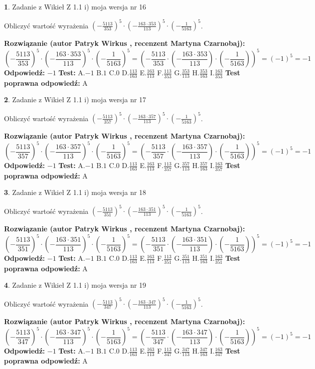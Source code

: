 \documentclass[12pt, a4paper]{article}
\theoremstyle{definition} %
\newtheorem{zad}{}
\newcommand{\zadStart}[1]{\begin{zad}#1\newline}
\newcommand{\zadStop}{\end{zad}}
\newcommand{\rozwStart}[2]{\noindent \textbf{Rozwiązanie (autor #1 , recenzent #2): }\newline}
\newcommand{\rozwStop}{\newline}
\newcommand{\odpStart}{\noindent \textbf{Odpowiedź:}\newline}
\newcommand{\odpStop}{\newline}
\newcommand{\testStart}{\noindent \textbf{Test:}\newline}
\newcommand{\testStop}{\newline}
\newcommand{\kluczStart}{\noindent \textbf{Test poprawna odpowiedź:}\newline}
\newcommand{\kluczStop}{\newline}
\begin{document}
\zadStart{Zadanie z Wikieł Z 1.1 i) moja wersja nr 16}

Obliczyć wartość wyrażenia $(-\frac{5113}{353})^{5} \cdot (-\frac{163 \cdot 353}{113})^{5} \cdot (-\frac{1}{5163})^{5}$.
\zadStop
\rozwStart{Patryk Wirkus}{Martyna Czarnobaj}
$$(-\frac{5113}{353})^{5} \cdot (-\frac{163 \cdot 353}{113})^{5} \cdot (-\frac{1}{5163})^{5} = (-\frac{5113}{353} \cdot (-\frac{163 \cdot 353}{113}) \cdot (-\frac{1}{5163}))^{5} = (-1)^{5} = -1$$
\rozwStop
\odpStart
$-1$
\odpStop
\testStart
A.$-1$ B.$1$ C.$0$ D.$\frac{113}{163}$ E.$\frac{163}{113}$
F.$\frac{113}{353}$ G.$\frac{353}{113}$
H.$\frac{353}{163}$
I.$\frac{163}{353}$
\testStop
\kluczStart
A
\kluczStop



\zadStart{Zadanie z Wikieł Z 1.1 i) moja wersja nr 17}

Obliczyć wartość wyrażenia $(-\frac{5113}{357})^{5} \cdot (-\frac{163 \cdot 357}{113})^{5} \cdot (-\frac{1}{5163})^{5}$.
\zadStop
\rozwStart{Patryk Wirkus}{Martyna Czarnobaj}
$$(-\frac{5113}{357})^{5} \cdot (-\frac{163 \cdot 357}{113})^{5} \cdot (-\frac{1}{5163})^{5} = (-\frac{5113}{357} \cdot (-\frac{163 \cdot 357}{113}) \cdot (-\frac{1}{5163}))^{5} = (-1)^{5} = -1$$
\rozwStop
\odpStart
$-1$
\odpStop
\testStart
A.$-1$ B.$1$ C.$0$ D.$\frac{113}{163}$ E.$\frac{163}{113}$
F.$\frac{113}{357}$ G.$\frac{357}{113}$
H.$\frac{357}{163}$
I.$\frac{163}{357}$
\testStop
\kluczStart
A
\kluczStop



\zadStart{Zadanie z Wikieł Z 1.1 i) moja wersja nr 18}

Obliczyć wartość wyrażenia $(-\frac{5113}{351})^{5} \cdot (-\frac{163 \cdot 351}{113})^{5} \cdot (-\frac{1}{5163})^{5}$.
\zadStop
\rozwStart{Patryk Wirkus}{Martyna Czarnobaj}
$$(-\frac{5113}{351})^{5} \cdot (-\frac{163 \cdot 351}{113})^{5} \cdot (-\frac{1}{5163})^{5} = (-\frac{5113}{351} \cdot (-\frac{163 \cdot 351}{113}) \cdot (-\frac{1}{5163}))^{5} = (-1)^{5} = -1$$
\rozwStop
\odpStart
$-1$
\odpStop
\testStart
A.$-1$ B.$1$ C.$0$ D.$\frac{113}{163}$ E.$\frac{163}{113}$
F.$\frac{113}{351}$ G.$\frac{351}{113}$
H.$\frac{351}{163}$
I.$\frac{163}{351}$
\testStop
\kluczStart
A
\kluczStop



\zadStart{Zadanie z Wikieł Z 1.1 i) moja wersja nr 19}

Obliczyć wartość wyrażenia $(-\frac{5113}{347})^{5} \cdot (-\frac{163 \cdot 347}{113})^{5} \cdot (-\frac{1}{5163})^{5}$.
\zadStop
\rozwStart{Patryk Wirkus}{Martyna Czarnobaj}
$$(-\frac{5113}{347})^{5} \cdot (-\frac{163 \cdot 347}{113})^{5} \cdot (-\frac{1}{5163})^{5} = (-\frac{5113}{347} \cdot (-\frac{163 \cdot 347}{113}) \cdot (-\frac{1}{5163}))^{5} = (-1)^{5} = -1$$
\rozwStop
\odpStart
$-1$
\odpStop
\testStart
A.$-1$ B.$1$ C.$0$ D.$\frac{113}{163}$ E.$\frac{163}{113}$
F.$\frac{113}{347}$ G.$\frac{347}{113}$
H.$\frac{347}{163}$
I.$\frac{163}{347}$
\testStop
\kluczStart
A
\kluczStop
\end{document}
